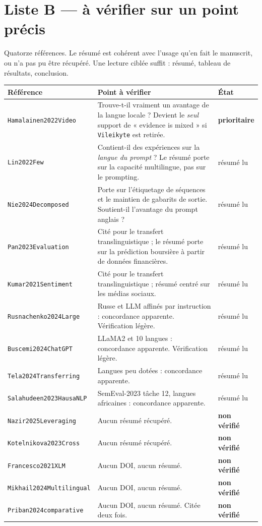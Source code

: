 \documentclass[11pt,a4paper]{article}
\newcommand{\cle}[1]{\texttt{\small #1}}
\begin{document}
\section{Liste B --- à vérifier sur un point précis}

Quatorze références. Le résumé est cohérent avec l'usage qu'en fait le
manuscrit, ou n'a pas pu être récupéré. Une lecture ciblée suffit : résumé,
tableau de résultats, conclusion.

\begin{center}
\small
\begin{longtable}{@{}p{3.4cm}p{7.6cm}p{3.4cm}@{}}
\toprule
\textbf{Référence} & \textbf{Point à vérifier} & \textbf{État} \\
\midrule
\endhead
\cle{Hamalainen2022Video} &
Trouve-t-il vraiment un avantage de la langue locale ? Devient le \emph{seul}
support de « evidence is mixed » si \cle{Vileikyte} est retirée. &
\textbf{prioritaire} \\
\cle{Lin2022Few} &
Contient-il des expériences sur la \emph{langue du prompt} ? Le résumé porte sur
la capacité multilingue, pas sur le prompting. & résumé lu \\
\cle{Nie2024Decomposed} &
Porte sur l'étiquetage de séquences et le maintien de gabarits de sortie.
Soutient-il l'avantage du prompt anglais ? & résumé lu \\
\cle{Pan2023Evaluation} &
Cité pour le transfert translinguistique ; le résumé porte sur la prédiction
boursière à partir de données financières. & résumé lu \\
\cle{Kumar2021Sentiment} &
Cité pour le transfert translinguistique ; résumé centré sur les médias
sociaux. & résumé lu \\
\cle{Rusnachenko2024Large} &
Russe et LLM affinés par instruction : concordance apparente. Vérification
légère. & résumé lu \\
\cle{Buscemi2024ChatGPT} &
LLaMA2 et 10 langues : concordance apparente. Vérification légère. &
résumé lu \\
\cle{Tela2024Transferring} &
Langues peu dotées : concordance apparente. & résumé lu \\
\cle{Salahudeen2023HausaNLP} &
SemEval-2023 tâche 12, langues africaines : concordance apparente. &
résumé lu \\
\cle{Nazir2025Leveraging} & Aucun résumé récupéré. & \textbf{non vérifié} \\
\cle{Kotelnikova2023Cross} & Aucun résumé récupéré. & \textbf{non vérifié} \\
\cle{Francesco2021XLM} & Aucun DOI, aucun résumé. & \textbf{non vérifié} \\
\cle{Mikhail2024Multilingual} & Aucun DOI, aucun résumé. & \textbf{non vérifié} \\
\cle{Priban2024comparative} & Aucun DOI, aucun résumé. Citée deux fois. &
\textbf{non vérifié} \\
\bottomrule
\end{longtable}
\end{center}
\end{document}

